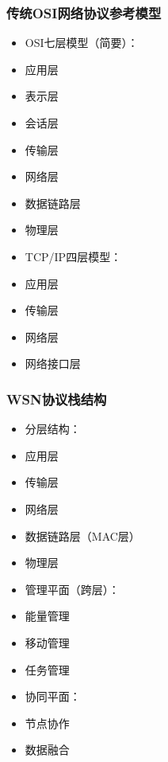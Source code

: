 \documentclass[aspectratio=43]{beamer}
\begin{document}
\begin{frame}
  \frametitle{传统OSI网络协议参考模型}

  \begin{itemize}
  \item<+-> OSI七层模型（简要）：
  \item<+-> 应用层
  \item<+-> 表示层
  \item<+-> 会话层
  \item<+-> 传输层
  \item<+-> 网络层
  \item<+-> 数据链路层
  \item<+-> 物理层
  \item<+-> TCP/IP四层模型：
  \item<+-> 应用层
  \item<+-> 传输层
  \item<+-> 网络层
  \item<+-> 网络接口层
  \end{itemize}
\end{frame}

\begin{frame}
  \frametitle{WSN协议栈结构}

  \begin{itemize}
  \item<+-> 分层结构：
  \item<+-> 应用层
  \item<+-> 传输层
  \item<+-> 网络层
  \item<+-> 数据链路层（MAC层）
  \item<+-> 物理层
  \item<+-> 管理平面（跨层）：
  \item<+-> 能量管理
  \item<+-> 移动管理
  \item<+-> 任务管理
  \item<+-> 协同平面：
  \item<+-> 节点协作
  \item<+-> 数据融合
  \end{itemize}
\end{frame}
\end{document}
